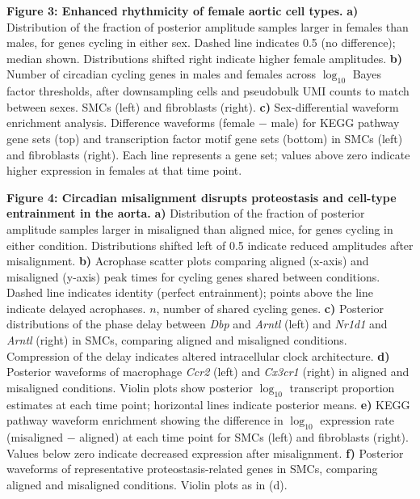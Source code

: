 \documentclass[12pt]{article}
\begin{document}
\bigskip

\textbf{Figure 3: Enhanced rhythmicity of female aortic cell types.}
\textbf{a)} Distribution of the fraction of posterior amplitude samples larger in females than
males, for genes cycling in either sex. Dashed line indicates 0.5 (no difference); median shown.
Distributions shifted right indicate higher female amplitudes.
\textbf{b)} Number of circadian cycling genes in males and females across $\log_{10}$ Bayes factor
thresholds, after downsampling cells and pseudobulk UMI counts to match between sexes. SMCs (left)
and fibroblasts (right).
\textbf{c)} Sex-differential waveform enrichment analysis. Difference waveforms (female $-$ male)
for KEGG pathway gene sets (top) and transcription factor motif gene sets (bottom) in SMCs (left)
and fibroblasts (right). Each line represents a gene set; values above zero indicate higher
expression in females at that time point.

\bigskip

\textbf{Figure 4: Circadian misalignment disrupts proteostasis and cell-type entrainment in the
aorta.}
\textbf{a)} Distribution of the fraction of posterior amplitude samples larger in misaligned than
aligned mice, for genes cycling in either condition. Distributions shifted left of 0.5 indicate
reduced amplitudes after misalignment.
\textbf{b)} Acrophase scatter plots comparing aligned (x-axis) and misaligned (y-axis) peak times
for cycling genes shared between conditions. Dashed line indicates identity (perfect entrainment);
points above the line indicate delayed acrophases. $n$, number of shared cycling genes.
\textbf{c)} Posterior distributions of the phase delay between \textit{Dbp} and \textit{Arntl}
(left) and \textit{Nr1d1} and \textit{Arntl} (right) in SMCs, comparing aligned and misaligned
conditions. Compression of the delay indicates altered intracellular clock architecture.
\textbf{d)} Posterior waveforms of macrophage \textit{Ccr2} (left) and \textit{Cx3cr1} (right) in
aligned and misaligned conditions. Violin plots show posterior $\log_{10}$ transcript proportion
estimates at each time point; horizontal lines indicate posterior means.
\textbf{e)} KEGG pathway waveform enrichment showing the difference in $\log_{10}$ expression rate
(misaligned $-$ aligned) at each time point for SMCs (left) and fibroblasts (right). Values below
zero indicate decreased expression after misalignment.
\textbf{f)} Posterior waveforms of representative proteostasis-related genes in SMCs, comparing
aligned and misaligned conditions. Violin plots as in (d).
\end{document}
